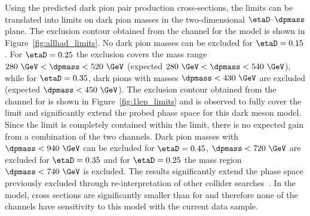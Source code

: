 Using the predicted dark pion pair production cross-sections, the limits can be translated into limits on dark pion masses in the two-dimensional $\etaD\text{--}\dpmass$ plane. The exclusion contour obtained from the \allhad channel for the \sul model is shown in Figure~\ref{fig:allhad_limits}. 
No dark pion masses can be excluded for $\etaD=0.15$. 
For $\etaD=0.25$ the exclusion covers the mass range $280~\GeV<\dpmass<520~\GeV$ (expected $280~\GeV<\dpmass<540~\GeV$), while for $\etaD=0.35$, dark pions with masses $\dpmass<430~\GeV$ are excluded (expected $\dpmass<450~\GeV$). %
The exclusion contour obtained from the \onelep channel for \sul is shown in Figure~\ref{fig:1lep_limits} and is observed to fully cover the \allhad limit and significantly extend the probed phase space for this dark meson model. Since the \allhad limit is completely contained within the \onelep limit, there is no expected gain from a combination of the two channels.
Dark pion masses with $\dpmass<940~\GeV$ can be excluded for $\etaD=0.45$, $\dpmass<720~\GeV$ are excluded for $\etaD=0.35$ and for $\etaD=0.25$ the mass region $\dpmass<740~\GeV$ is excluded. The results significantly extend the phase space previously excluded through re-interpretation of other collider searches~\cite{Butterworth:2021jto}.
In the \sur model, cross sections are significantly smaller than for \sul and therefore none of the channels have sensitivity to this model with the current data sample.

